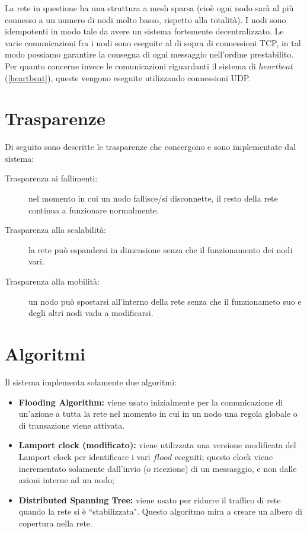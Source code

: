 \documentclass[italian]{memoir}
\begin{document}
La rete in questione ha una struttura a mesh sparsa (cioè ogni nodo sarà al più
	   connesso a un numero di nodi molto basso, rispetto alla totalità).
I nodi sono idempotenti in modo tale da avere un sistema fortemente decentralizzato.
Le varie comunicazioni fra i nodi sono eseguite al di sopra di connessioni TCP, in
	   tal modo possiamo garantire la consegna di ogni messaggio nell'ordine prestabilito.
Per quanto concerne invece le comunicazioni riguardanti il sistema di $heartbeat$
	   (\ref{heartbeat}), queste vengono eseguite utilizzando connessioni UDP.

\section{Trasparenze}\label{Trasparenze}

Di seguito sono descritte le trasparenze che concergono e sono implementate dal sistema:

\begin{description} 
\item[Trasparenza ai fallimenti:] nel momento in cui un nodo fallisce/si disconnette,
	   il resto della rete continua a funzionare normalmente.
\item[Trasparenza alla scalabilità:] la rete può espandersi in dimensione senza
	   che il funzionamento dei nodi vari.
\item[Trasparenza alla mobilità:] un nodo può spostarsi all'interno della rete
	   senza che il funzionameto suo e degli altri nodi vada a modificarsi.
\end{description}

\section{Algoritmi}

Il sistema implementa solamente due algoritmi:
\begin{itemize}
\item \textbf{Flooding Algorithm:} viene usato inizialmente per la comunicazione di un'azione
	   a tutta la rete nel momento in cui in un nodo una regola globale o di transazione viene attivata.
\item \textbf{Lamport clock (modificato):} viene utilizzata una versione modificata
	   del Lamport clock per identificare i vari $flood$ eseguiti; questo clock viene
	   incrementato
	   solamente dall'invio (o ricezione) di un messasggio, e non dalle azioni interne
	   ad un nodo;
\item \textbf{Distributed Spanning Tree:} viene usato per ridurre il traffico di rete 
       quando la rete si è ``stabilizzata". Questo algoritmo mira a creare un albero di
       copertura nella rete.
\end{itemize}
\end{document}

